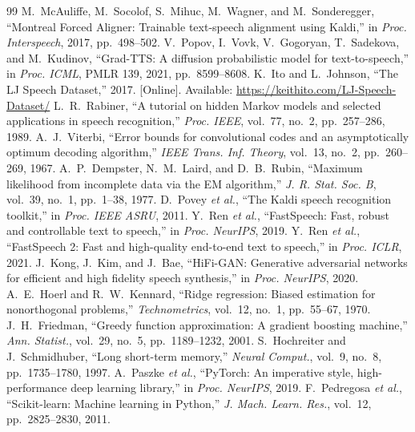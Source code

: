 \documentclass[conference]{IEEEtran}
\begin{document}
\begin{thebibliography}{99}
 M.~McAuliffe, M.~Socolof, S.~Mihuc, M.~Wagner, and M.~Sonderegger, ``Montreal Forced Aligner: Trainable text-speech alignment using Kaldi,'' in \emph{Proc. Interspeech}, 2017, pp.\ 498--502.
 V.~Popov, I.~Vovk, V.~Gogoryan, T.~Sadekova, and M.~Kudinov, ``Grad-TTS: A diffusion probabilistic model for text-to-speech,'' in \emph{Proc. ICML}, PMLR 139, 2021, pp.\ 8599--8608.
 K.~Ito and L.~Johnson, ``The LJ Speech Dataset,'' 2017. [Online]. Available: \url{https://keithito.com/LJ-Speech-Dataset/}
 L.~R.~Rabiner, ``A tutorial on hidden Markov models and selected applications in speech recognition,'' \emph{Proc. IEEE}, vol.~77, no.~2, pp.\ 257--286, 1989.
 A.~J.~Viterbi, ``Error bounds for convolutional codes and an asymptotically optimum decoding algorithm,'' \emph{IEEE Trans. Inf. Theory}, vol.~13, no.~2, pp.\ 260--269, 1967.
 A.~P.~Dempster, N.~M.~Laird, and D.~B.~Rubin, ``Maximum likelihood from incomplete data via the EM algorithm,'' \emph{J. R. Stat. Soc. B}, vol.~39, no.~1, pp.\ 1--38, 1977.
 D.~Povey \emph{et al.}, ``The Kaldi speech recognition toolkit,'' in \emph{Proc. IEEE ASRU}, 2011.
 Y.~Ren \emph{et al.}, ``FastSpeech: Fast, robust and controllable text to speech,'' in \emph{Proc. NeurIPS}, 2019.
 Y.~Ren \emph{et al.}, ``FastSpeech 2: Fast and high-quality end-to-end text to speech,'' in \emph{Proc. ICLR}, 2021.
 J.~Kong, J.~Kim, and J.~Bae, ``HiFi-GAN: Generative adversarial networks for efficient and high fidelity speech synthesis,'' in \emph{Proc. NeurIPS}, 2020.
 A.~E.~Hoerl and R.~W.~Kennard, ``Ridge regression: Biased estimation for nonorthogonal problems,'' \emph{Technometrics}, vol.~12, no.~1, pp.\ 55--67, 1970.
 J.~H.~Friedman, ``Greedy function approximation: A gradient boosting machine,'' \emph{Ann. Statist.}, vol.~29, no.~5, pp.\ 1189--1232, 2001.
 S.~Hochreiter and J.~Schmidhuber, ``Long short-term memory,'' \emph{Neural Comput.}, vol.~9, no.~8, pp.\ 1735--1780, 1997.
 A.~Paszke \emph{et al.}, ``PyTorch: An imperative style, high-performance deep learning library,'' in \emph{Proc. NeurIPS}, 2019.
 F.~Pedregosa \emph{et al.}, ``Scikit-learn: Machine learning in Python,'' \emph{J. Mach. Learn. Res.}, vol.~12, pp.\ 2825--2830, 2011.
\end{thebibliography}
\end{document}
